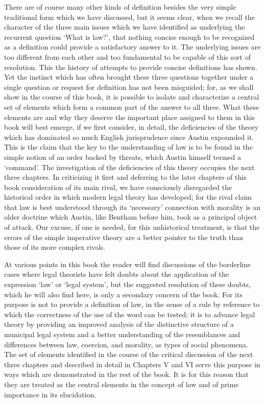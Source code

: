 There are of course many other kinds of definition besides the very
simple traditional form which we have discussed, but it seems clear,
when we recall the character of the three main issues which we have
identified as underlying the recurrent question `What is law?', that
nothing concise enough to be recognized as a definition could provide a
satisfactory answer to it. The underlying issues are too different from
each other and too fundamental to be capable of this sort of resolution.
This the history of attempts to provide concise definitions has shown.
Yet the instinct which has often brought these three questions together
under a single question or request for definition has not been
misguided; for, as we shall show in the course of this book, it is
possible to isolate and characterize a central set of elements which
form a common part of the answer to all three. What these elements are
and why they deserve the important place assigned to them in this book
will best emerge, if we first consider, in detail, the deficiencies of
the theory which has dominated so much English jurisprudence since
Austin expounded it. This is the claim that the key to the understanding
of law is to be found in the simple notion of an order backed by
threats, which Austin himself termed a `command'. The investigation of
the deficiencies of this theory occupies the next three chapters. In
criticizing it first and deferring to the later chapters of this book
consideration of its main rival, we have consciously disregarded the
historical order in which modern legal theory has developed; for the
rival claim that law is best understood through its `necessary'
connection with morality is an older doctrine which Austin, like Bentham
before him, took as a principal object of attack. Our excuse, if one is
needed, for this unhistorical treatment, is that the errors of the
simple imperative theory are a better pointer to the truth than those of
its more complex rivals.

At various points in this book the reader will find discussions of the
borderline cases where legal theorists have felt doubts about the
application of the expression `law' or `legal system', but the suggested
resolution of these doubts, which he will also find here, is only a
secondary concern of the book. For its purpose is not to provide a
definition of law, in the sense of a rule by reference to which the
correctness of the use of the word can be tested; it is to advance legal
theory by providing an improved analysis of the distinctive structure of
a municipal legal system and a better understanding of the resemblances
and differences between law, coercion, and morality, as types of social
phenomena. The set of elements identified in the course of the critical
discussion of the next three chapters and described in detail in
Chapters V and VI serve this purpose in ways which are demonstrated in
the rest of the book. It is for this reason that they are treated as the
central elements in the concept of law and of prime importance in its
elucidation.

